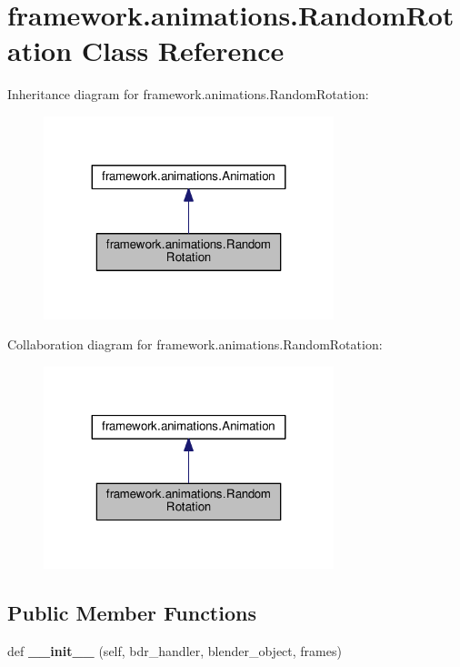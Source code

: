 \hypertarget{classframework_1_1animations_1_1RandomRotation}{}\section{framework.\+animations.\+Random\+Rotation Class Reference}
\label{classframework_1_1animations_1_1RandomRotation}


Inheritance diagram for framework.\+animations.\+Random\+Rotation\+:
\nopagebreak
\begin{figure}[H]
\begin{center}
\leavevmode
\includegraphics[width=239pt]{classframework_1_1animations_1_1RandomRotation__inherit__graph}
\end{center}
\end{figure}


Collaboration diagram for framework.\+animations.\+Random\+Rotation\+:
\nopagebreak
\begin{figure}[H]
\begin{center}
\leavevmode
\includegraphics[width=239pt]{classframework_1_1animations_1_1RandomRotation__coll__graph}
\end{center}
\end{figure}
\subsection*{Public Member Functions}
\begin{DoxyCompactItemize}
\item 
def {\bfseries \+\_\+\+\_\+init\+\_\+\+\_\+} (self, bdr\+\_\+handler, blender\+\_\+object, frames)\hypertarget{classframework_1_1animations_1_1RandomRotation_a095a809c807ec64f927e4370b712ff9e}{}\label{classframework_1_1animations_1_1RandomRotation_a095a809c807ec64f927e4370b712ff9e}

\end{DoxyCompactItemize}
